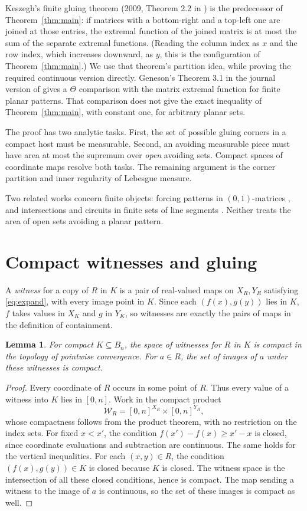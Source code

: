 \documentclass[11pt]{article}
\newtheorem{lemma}[theorem]{Lemma}
\begin{document}
Keszegh's finite gluing theorem (2009, Theorem 2.2 in \cite{Keszegh}) is the predecessor of Theorem~\ref{thm:main}: if matrices with a bottom-right and a top-left one are joined at those entries, the extremal function of the joined matrix is at most the sum of the separate extremal functions. (Reading the column index as $x$ and the row index, which increases downward, as $y$, this is the configuration of Theorem~\ref{thm:main}.) We use that theorem's partition idea, while proving the required continuous version directly. Geneson's Theorem 3.1 in the journal version of \cite{Geneson} gives a $\Theta$ comparison with the matrix extremal function for finite planar patterns. That comparison does not give the exact inequality of Theorem~\ref{thm:main}, with constant one, for arbitrary planar sets.

The proof has two analytic tasks. First, the set of possible gluing corners in a compact host must be measurable. Second, an avoiding measurable piece must have area at most the supremum over \emph{open} avoiding sets. Compact spaces of coordinate maps resolve both tasks. The remaining argument is the corner partition and inner regularity of Lebesgue measure.

Two related works concern finite objects: forcing patterns in $(0,1)$-matrices \cite{CaoTsai}, and intersections and circuits in finite sets of line segments \cite{Brimkov,BrimkovArXiv}. Neither treats the area of open sets avoiding a planar pattern.

\section{Compact witnesses and gluing}
A \emph{witness} for a copy of $R$ in $K$ is a pair of real-valued maps on $X_R,Y_R$ satisfying \eqref{eq:expand}, with every image point in $K$. Since each $(f(x),g(y))$ lies in $K$, $f$ takes values in $X_K$ and $g$ in $Y_K$, so witnesses are exactly the pairs of maps in the definition of containment.

\begin{lemma}\label{lem:compact}
For compact $K\subseteq B_n$, the space of witnesses for $R$ in $K$ is compact in the topology of pointwise convergence. For $a\in R$, the set of images of $a$ under these witnesses is compact.
\end{lemma}
\begin{proof}
Every coordinate of $R$ occurs in some point of $R$. Thus every value of a witness into $K$ lies in $[0,n]$. Work in the compact product
\[
 \mathcal W_R=[0,n]^{X_R}\times[0,n]^{Y_R},
\]
whose compactness follows from the product theorem, with no restriction on the index sets. For fixed $x<x'$, the condition $f(x')-f(x)\ge x'-x$ is closed, since coordinate evaluations and subtraction are continuous. The same holds for the vertical inequalities. For each $(x,y)\in R$, the condition $(f(x),g(y))\in K$ is closed because $K$ is closed. The witness space is the intersection of all these closed conditions, hence is compact. The map sending a witness to the image of $a$ is continuous, so the set of these images is compact as well.
\end{proof}
\end{document}
